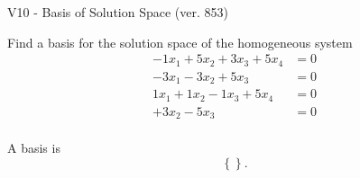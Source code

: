 \begin{exercise}
  \begin{exerciseTitle}V10 - Basis of Solution Space (ver. 853)\end{exerciseTitle}
  \begin{exerciseStatement}
    Find a basis for the solution space of the homogeneous system 
\begin{align*}
 -1 x_ 1 + 5 x_ 2 + 3 x_ 3 + 5 x_ 4 &= 0  \\ 
  -3 x_ 1 -3 x_ 2 + 5 x_ 3 &= 0  \\ 
  1 x_ 1 + 1 x_ 2 -1 x_ 3 + 5 x_ 4 &= 0  \\ 
  + 3 x_ 2 -5 x_ 3 &= 0  \\ 
 \end{align*}


 
  \end{exerciseStatement}

  \begin{exerciseAnswer}
   A basis is   
\[\left\{\right\}.\]

  


  \end{exerciseAnswer}
\end{exercise}